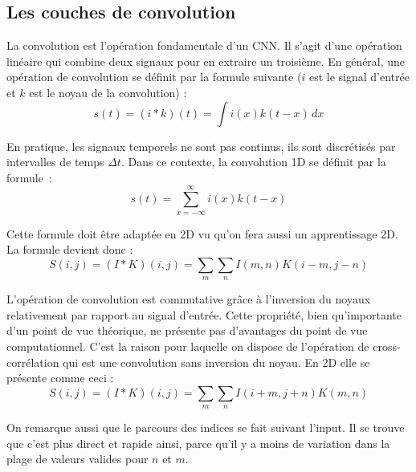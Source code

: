 \subsection{Les couches de convolution}
La convolution est l'opération fondamentale d'un CNN. Il s'agit d'une opération linéaire qui combine deux signaux pour en extraire un troisième. En général, une opération de convolution se définit par la formule suivante ($i$ est le signal d'entrée et $k$ est le noyau de la convolution) :
$$ s(t) = (i * k)(t) = \int i(x)k(t-x) \, dx $$

En pratique, les signaux temporels ne sont pas continus, ils sont discrétisés par intervalles de temps $\Delta t$. Dans ce contexte, la convolution 1D se définit par la formule :
\begin{equation}
 s(t) = \sum_{x=-\infty}^{\infty} i(x)k(t-x)
 \label{eqn:Conv1D}
\end{equation}

Cette formule doit être adaptée en 2D vu qu'on fera aussi un apprentissage 2D. La formule devient donc :
\begin{equation}
 S(i,j) = (I * K)(i,j) = \sum_{m}\sum_{n} I(m,n)K(i-m,j-n)
 \label{eqn:Conv2D}
\end{equation}

L'opération de convolution est commutative grâce à l'inversion du noyaux relativement par rapport au signal d'entrée. Cette propriété, bien qu'importante d'un point de vue théorique, ne présente pas d'avantages du point de vue computationnel. C'est la raison pour laquelle on dispose de l'opération de cross-corrélation qui est une convolution sans inversion du noyau. En 2D elle se présente comme ceci :
\begin{equation}
 S(i,j) = (I * K)(i,j) = \sum_{m}\sum_{n} I(i+m,j+n)K(m,n)
 \label{eqn:Corr2D}
\end{equation}

On remarque aussi que le parcours des indices se fait suivant l'input. Il se trouve que c'est plus direct et rapide ainsi, parce qu'il y a moins de variation dans la plage de valeurs valides pour $n$ et $m$. 

